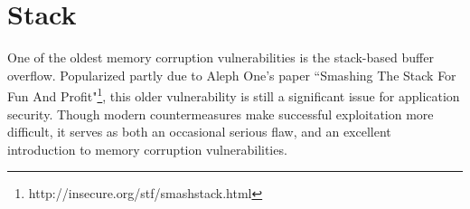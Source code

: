 \section{Stack}
One of the oldest memory corruption vulnerabilities is the stack-based buffer overflow.
Popularized partly due to Aleph One's paper ``Smashing The Stack For Fun And Profit"\footnote{http://insecure.org/stf/smashstack.html},
this older vulnerability is still a significant issue for application
security. Though modern countermeasures make successful exploitation more difficult, it serves
as both an occasional serious flaw, and an excellent introduction to memory corruption vulnerabilities.






